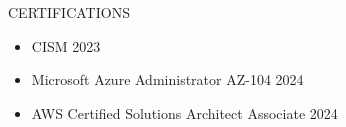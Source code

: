 \documentclass{resume} %
\begin{document}
\begin{rSection}{CERTIFICATIONS}
    \begin{flushleft}
            \begin{itemize}
                    \item CISM 2023 \\
                    \item Microsoft Azure Administrator AZ{-}104 2024 \\
                    \item AWS Certified Solutions Architect Associate 2024 \\
                            \end{itemize}
        \end{flushleft}
\end{rSection}
\end{document}
